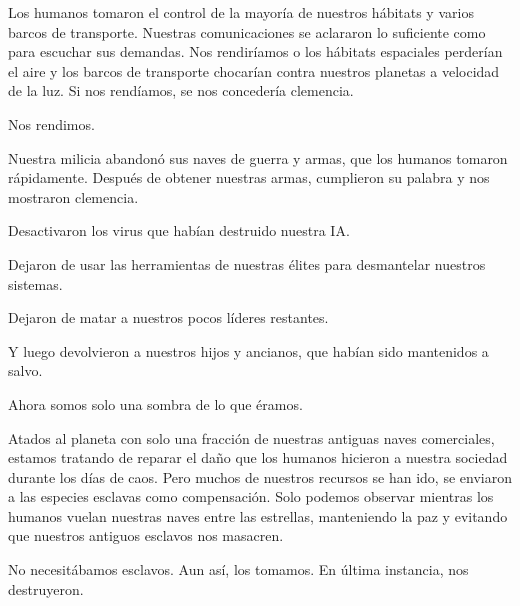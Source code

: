 \documentclass[spanish,12pt,a4paper,oneside,titlepage]{book}
\begin{document}
    Los humanos tomaron el control de la mayoría de nuestros hábitats y varios barcos de transporte. Nuestras comunicaciones se aclararon lo suficiente como para escuchar sus demandas. Nos rendiríamos o los hábitats espaciales perderían el aire y los barcos de transporte chocarían contra nuestros planetas a velocidad de la luz. Si nos rendíamos, se nos concedería clemencia.

    Nos rendimos.

    Nuestra milicia abandonó sus naves de guerra y armas, que los humanos tomaron rápidamente. Después de obtener nuestras armas, cumplieron su palabra y nos mostraron clemencia.

    Desactivaron los virus que habían destruido nuestra IA.

    Dejaron de usar las herramientas de nuestras élites para desmantelar nuestros sistemas.

    Dejaron de matar a nuestros pocos líderes restantes.

    Y luego devolvieron a nuestros hijos y ancianos, que habían sido mantenidos a salvo.

    Ahora somos solo una sombra de lo que éramos.

    Atados al planeta con solo una fracción de nuestras antiguas naves comerciales, estamos tratando de reparar el daño que los humanos hicieron a nuestra sociedad durante los días de caos. Pero muchos de nuestros recursos se han ido, se enviaron a las especies esclavas como compensación. Solo podemos observar mientras los humanos vuelan nuestras naves entre las estrellas, manteniendo la paz y evitando que nuestros antiguos esclavos nos masacren.

    No necesitábamos esclavos. Aun así, los tomamos. En última instancia, nos destruyeron.
\end{document}
